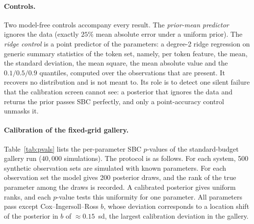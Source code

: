 \documentclass[10pt]{article}
\begin{document}
\paragraph{Controls.}
\label{sec:baselines-tiers}
Two model-free controls accompany every result. The \emph{prior-mean predictor} ignores the data
(exactly $25\%$ mean absolute error under a uniform prior). The \emph{ridge control} is a point
predictor of the parameters: a degree-2 ridge regression on generic summary statistics of the token
set, namely, per token feature, the mean, the standard deviation, the mean square, the mean absolute
value and the $0.1/0.5/0.9$ quantiles, computed over the observations that are present. It recovers
no distribution and is not meant to. Its role is to detect one silent failure that the calibration
screen cannot see: a posterior that ignores the data and returns the prior passes SBC perfectly, and
only a point-accuracy control unmasks it.

\paragraph{Calibration of the fixed-grid gallery.}

Table~\ref{tab:pvals} lists the per-parameter SBC $p$-values of the standard-budget gallery run
($40{,}000$ simulations). The protocol is as follows. For each system, 500 synthetic observation sets
are simulated with known parameters. For each observation set the model gives 200 posterior draws,
and the rank of the true parameter among the draws is recorded. A calibrated posterior gives uniform
ranks, and each $p$-value tests this uniformity for one parameter. All parameters pass except
Cox--Ingersoll--Ross $b$, whose deviation corresponds to a location shift of the posterior in $b$ of
$\approx 0.15$~sd, the largest calibration deviation in the gallery.
\end{document}
